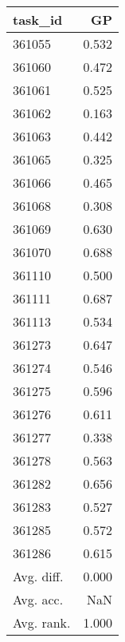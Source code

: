 \begin{tabular}{lr}
\toprule
task\_id & GP \\
\midrule
361055 & 0.532 \\
361060 & 0.472 \\
361061 & 0.525 \\
361062 & 0.163 \\
361063 & 0.442 \\
361065 & 0.325 \\
361066 & 0.465 \\
361068 & 0.308 \\
361069 & 0.630 \\
361070 & 0.688 \\
361110 & 0.500 \\
361111 & 0.687 \\
361113 & 0.534 \\
361273 & 0.647 \\
361274 & 0.546 \\
361275 & 0.596 \\
361276 & 0.611 \\
361277 & 0.338 \\
361278 & 0.563 \\
361282 & 0.656 \\
361283 & 0.527 \\
361285 & 0.572 \\
361286 & 0.615 \\
Avg. diff. & 0.000 \\
Avg. acc. & NaN \\
Avg. rank. & 1.000 \\
\bottomrule
\end{tabular}

